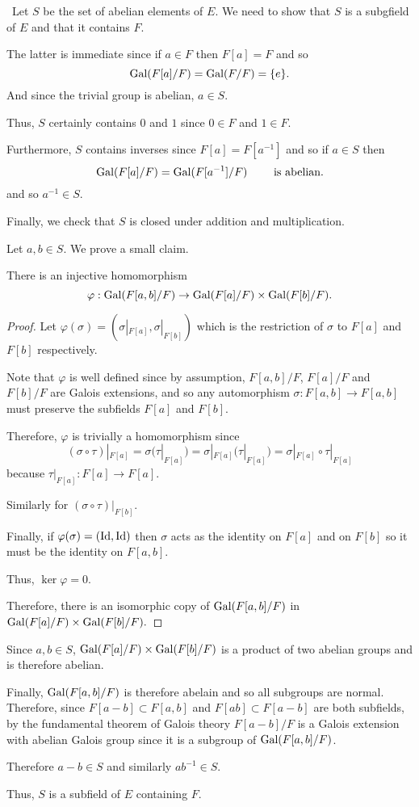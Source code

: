 \documentclass[12pt]{Qual}
\begin{document}
\begin{solution}$\,$
Let $S$ be the set of abelian elements of $E$. We need to show that $S$ is a subgfield of $E$ and that it contains $F.$

The latter is immediate since if $a\in F$ then $F[a]=F$ and so $$\text{Gal}(F[a]/F)=\text{Gal}(F/F)=\{e\}.$$ And since the trivial group is abelian, $a\in S$.

Thus, $S$ certainly contains $0$ and $1$ since $0\in F$ and $1\in F$.

Furthermore, $S$ contains inverses since $F[a]=F[a^{-1}]$ and so if $a\in S$ then $$\text{Gal}(F[a]/F)=\text{Gal}(F[a^{-1}]/F)\qquad\text{ is abelian.}$$ and so $a^{-1}\in S.$

Finally, we check that $S$ is closed under addition and multiplication.

Let $a,b\in S$. We prove a small claim.

\begin{claim} There is an injective homomorphism $$\varphi:\text{Gal}(F[a,b]/F)\to\text{Gal}(F[a]/F)\times\text{Gal}(F[b]/F).$$
\begin{proof} Let $\varphi(\sigma)=(\sigma|_{F[a]},\sigma|_{F[b]})$ which is the restriction of $\sigma$ to $F[a]$ and $F[b]$ respectively.

Note that $\varphi$ is well defined since by assumption, $F[a,b]/F$, $F[a]/F$ and $F[b]/F$ are Galois extensions, and so any automorphism $\sigma:F[a,b]\to F[a,b]$ must preserve the subfields $F[a]$ and $F[b]$.

Therefore, $\varphi$ is trivially a homomorphism since $$(\sigma\circ\tau)|_{F[a]}=\sigma(\tau|_{F[a]})=\sigma|_{F[a]}(\tau|_{F[a]})=\sigma|_{F[a]}\circ\tau|_{F[a]}$$ because $\tau|_{F[a]}:F[a]\to F[a]$.

Similarly for $(\sigma\circ\tau)|_{F[b]}$.

Finally, if $\varphi(\sigma)=(\text{Id},\text{Id})$ then $\sigma$ acts as the identity on $F[a]$ and on $F[b]$ so it must be the identity on $F[a,b]$.

Thus, $\ker\varphi=0$.

Therefore, there is an isomorphic copy of $\text{Gal}(F[a,b]/F)$ in $\text{Gal}(F[a]/F)\times\text{Gal}(F[b]/F).$
\end{proof}
\end{claim}

Since $a,b\in S$, $\text{Gal}(F[a]/F)\times\text{Gal}(F[b]/F)$ is a product of two abelian groups and is therefore abelian.

Finally, $\text{Gal}(F[a,b]/F)$ is therefore abelain  and so all subgroups are normal. Therefore, since $F[a-b]\subset F[a,b]$ and $F[ab]\subset F[a-b]$ are both subfields, by the fundamental theorem of Galois theory $F[a-b]/F$ is a Galois extension with abelian Galois group since it is a subgroup of $\text{Gal}(F[a,b]/F)$.

Therefore $a-b\in S$ and similarly $ab^{-1}\in S$.

Thus, $S$ is a subfield of $E$ containing $F$.
\end{solution}
\newpage
\end{document}

